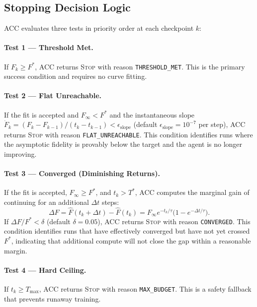 \subsection{Stopping Decision Logic}

ACC evaluates three tests in priority order at each checkpoint $k$:

\paragraph{Test 1 — Threshold Met.}
If $F_k \geq F^*$, ACC returns \textsc{Stop} with reason \texttt{THRESHOLD\_MET}.
This is the primary success condition and requires no curve fitting.

\paragraph{Test 2 — Flat Unreachable.}
If the fit is accepted and $F_\infty < F^*$ and the instantaneous slope
$\dot{F}_k = (F_k - F_{k-1})/(t_k - t_{k-1}) < \epsilon_{\mathrm{slope}}$
(default $\epsilon_{\mathrm{slope}} = 10^{-7}$ per step), ACC returns \textsc{Stop}
with reason \texttt{FLAT\_UNREACHABLE}. This condition identifies runs where the
asymptotic fidelity is provably below the target and the agent is no longer improving.

\paragraph{Test 3 — Converged (Diminishing Returns).}
If the fit is accepted, $F_\infty \geq F^*$, and $t_k > T^*$, ACC computes the
marginal gain of continuing for an additional $\Delta t$ steps:
\begin{equation}
  \Delta F = \hat{F}(t_k + \Delta t) - \hat{F}(t_k)
           = F_\infty e^{-t_k/\tau}\bigl(1 - e^{-\Delta t/\tau}\bigr).
\end{equation}
If $\Delta F / F^* < \delta$ (default $\delta = 0.05$), ACC returns \textsc{Stop}
with reason \texttt{CONVERGED}. This condition identifies runs that have effectively
converged but have not yet crossed $F^*$, indicating that additional compute will
not close the gap within a reasonable margin.

\paragraph{Test 4 — Hard Ceiling.}
If $t_k \geq T_{\max}$, ACC returns \textsc{Stop} with reason \texttt{MAX\_BUDGET}.
This is a safety fallback that prevents runaway training.

